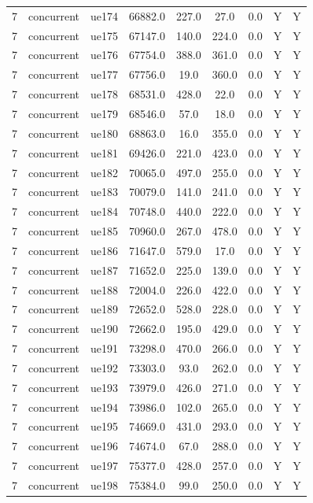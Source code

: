 \begin{table}[ht]
\begin{tabular}{|c|c|c|c|c|c|c|c|c|}
7 & concurrent & ue174 & 66882.0 & 227.0 & 27.0 & 0.0 & Y & Y \\
7 & concurrent & ue175 & 67147.0 & 140.0 & 224.0 & 0.0 & Y & Y \\
7 & concurrent & ue176 & 67754.0 & 388.0 & 361.0 & 0.0 & Y & Y \\
7 & concurrent & ue177 & 67756.0 & 19.0 & 360.0 & 0.0 & Y & Y \\
7 & concurrent & ue178 & 68531.0 & 428.0 & 22.0 & 0.0 & Y & Y \\
7 & concurrent & ue179 & 68546.0 & 57.0 & 18.0 & 0.0 & Y & Y \\
7 & concurrent & ue180 & 68863.0 & 16.0 & 355.0 & 0.0 & Y & Y \\
7 & concurrent & ue181 & 69426.0 & 221.0 & 423.0 & 0.0 & Y & Y \\
7 & concurrent & ue182 & 70065.0 & 497.0 & 255.0 & 0.0 & Y & Y \\
7 & concurrent & ue183 & 70079.0 & 141.0 & 241.0 & 0.0 & Y & Y \\
7 & concurrent & ue184 & 70748.0 & 440.0 & 222.0 & 0.0 & Y & Y \\
7 & concurrent & ue185 & 70960.0 & 267.0 & 478.0 & 0.0 & Y & Y \\
7 & concurrent & ue186 & 71647.0 & 579.0 & 17.0 & 0.0 & Y & Y \\
7 & concurrent & ue187 & 71652.0 & 225.0 & 139.0 & 0.0 & Y & Y \\
7 & concurrent & ue188 & 72004.0 & 226.0 & 422.0 & 0.0 & Y & Y \\
7 & concurrent & ue189 & 72652.0 & 528.0 & 228.0 & 0.0 & Y & Y \\
7 & concurrent & ue190 & 72662.0 & 195.0 & 429.0 & 0.0 & Y & Y \\
7 & concurrent & ue191 & 73298.0 & 470.0 & 266.0 & 0.0 & Y & Y \\
7 & concurrent & ue192 & 73303.0 & 93.0 & 262.0 & 0.0 & Y & Y \\
7 & concurrent & ue193 & 73979.0 & 426.0 & 271.0 & 0.0 & Y & Y \\
7 & concurrent & ue194 & 73986.0 & 102.0 & 265.0 & 0.0 & Y & Y \\
7 & concurrent & ue195 & 74669.0 & 431.0 & 293.0 & 0.0 & Y & Y \\
7 & concurrent & ue196 & 74674.0 & 67.0 & 288.0 & 0.0 & Y & Y \\
7 & concurrent & ue197 & 75377.0 & 428.0 & 257.0 & 0.0 & Y & Y \\
7 & concurrent & ue198 & 75384.0 & 99.0 & 250.0 & 0.0 & Y & Y \\

\end{tabular}
\end{table}
